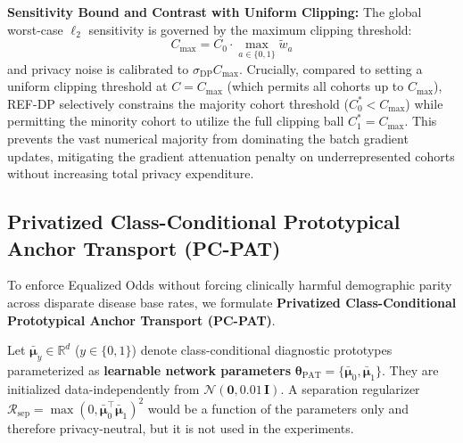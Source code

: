 \documentclass[3p,12pt]{elsarticle}
\theoremstyle{plain}
\theoremstyle{definition}
\begin{document}
\noindent \textbf{Sensitivity Bound and Contrast with Uniform Clipping:} The global worst-case $\ell_2$ sensitivity is governed by the maximum clipping threshold:
\begin{equation}
    C_{\max} = C_0 \cdot \max_{a \in \{0, 1\}} \tilde{w}_a
\end{equation}
and privacy noise is calibrated to $\sigma_{\text{DP}} C_{\max}$. Crucially, compared to setting a uniform clipping threshold at $C = C_{\max}$ (which permits all cohorts up to $C_{\max}$), REF-DP selectively constrains the majority cohort threshold ($C_0^* < C_{\max}$) while permitting the minority cohort to utilize the full clipping ball $C_1^* = C_{\max}$. This prevents the vast numerical majority from dominating the batch gradient updates, mitigating the gradient attenuation penalty on underrepresented cohorts without increasing total privacy expenditure.

\subsection{Privatized Class-Conditional Prototypical Anchor Transport (PC-PAT)}
\label{sec:pc_pat}

To enforce Equalized Odds without forcing clinically harmful demographic parity across disparate disease base rates, we formulate \textbf{Privatized Class-Conditional Prototypical Anchor Transport (PC-PAT)}.

Let $\bar{\boldsymbol{\mu}}_y \in \mathbb{R}^d$ ($y \in \{0, 1\}$) denote class-conditional diagnostic prototypes parameterized as \textbf{learnable network parameters} $\boldsymbol{\theta}_{\text{PAT}} = \{\bar{\boldsymbol{\mu}}_0, \bar{\boldsymbol{\mu}}_1\}$. They are initialized data-independently from $\mathcal{N}(\mathbf{0}, 0.01\,\mathbf{I})$. A separation regularizer $\mathcal{R}_{\text{sep}} = \max(0, \bar{\boldsymbol{\mu}}_0^\top \bar{\boldsymbol{\mu}}_1)^2$ would be a function of the parameters only and therefore privacy-neutral, but it is not used in the experiments.
\end{document}
